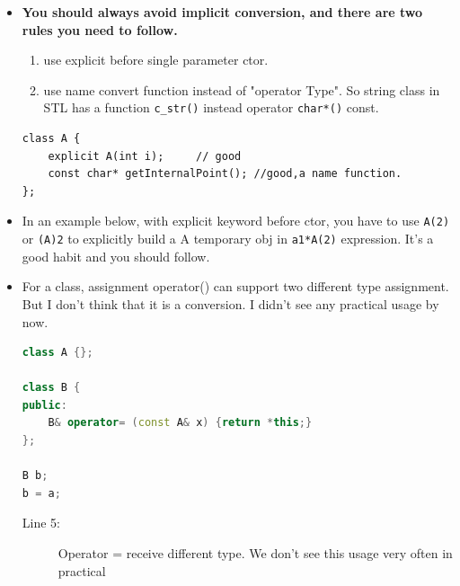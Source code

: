 \documentclass[a4paper,11pt,twoside]{book}
\begin{document}
\begin{itemize}
	\item \textbf{You should always avoid implicit conversion, and there are two rules you need to follow.}
	\begin{enumerate}
		\item use explicit before single parameter ctor.
		\item use name convert function instead of  "operator Type". So string class in STL has a function \texttt{c\_str()} instead operator \texttt{char*()} const. 
	\end{enumerate}
\begin{lstlisting}[numbers=none]
class A {
	explicit A(int i);     // good
	const char* getInternalPoint(); //good,a name function.
};	
\end{lstlisting}
	
	\item In an example below, with explicit keyword before ctor,  you have to use \texttt{A(2)} or \texttt{(A)2} to explicitly build a A temporary obj in \texttt{a1*A(2)} expression. It's a good habit and you should follow. 
	
	
	\item For a class, assignment operator() can support two different type assignment. But I don't think that it is a conversion. I didn't see any practical usage by now. 
\begin{lstlisting}[frame=single, language=c++]
class A {};
	
class B {
public:
	B& operator= (const A& x) {return *this;}
};
	
B b;
b = a; 
\end{lstlisting}
\begin{description}
	\item[Line 5:] Operator = receive different type. We don't see this usage very often in practical 
\end{description}
\end{itemize}
\end{document}
